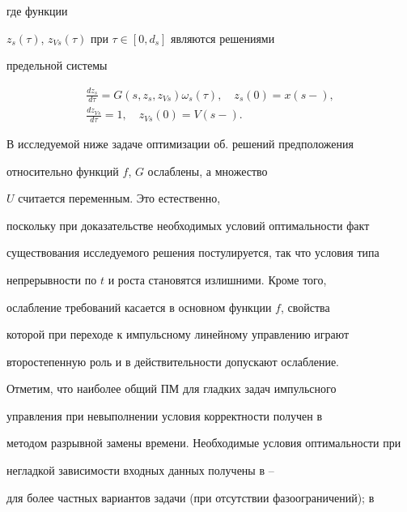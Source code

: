где функции


$z_s(\tau)$, $z_{Vs}(\tau)$ при $\tau\in [0,d_s]$ являются решениями


предельной системы


\begin{equation}


\begin{array}{c}


\displaystyle\frac{dz_s}{d\tau}=G(s,z_s,z_{Vs})\omega_s(\tau),


\quad z_s(0)=x(s-),\\[3mm]


\displaystyle\frac{dz_{Vs}}{d\tau}=1, \quad z_{Vs}(0)=V(s-).


\end{array}


\label{gl9}


\end{equation}





В исследуемой ниже задаче оптимизации об. решений предположения


относительно функций $f$, $G$ ослаблены, а множество


$U$ считается переменным. Это естественно,


поскольку при доказательстве необходимых условий оптимальности факт


существования исследуемого решения постулируется, так что условия типа


непрерывности по $t$ и роста становятся излишними. Кроме того,


ослабление требований касается в основном функции $f$, свойства


которой при переходе к импульсному линейному управлению играют


второстепенную роль и в действительности допускают ослабление.





Отметим, что наиболее общий ПМ для гладких задач импульсного


управления при невыполнении условия корректности получен в \cite{M92}


методом разрывной замены времени. Необходимые условия оптимальности при


негладкой зависимости входных данных получены в \cite{V.P.}--\cite{D.S.}


для более частных вариантов задачи (при отсутствии фазоограничений); в


